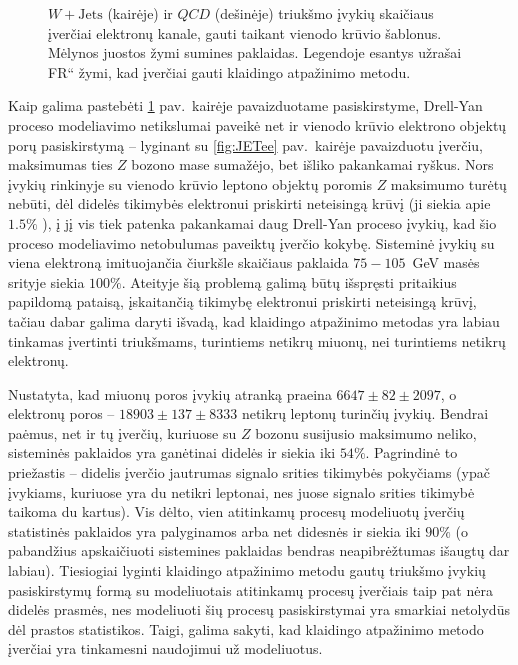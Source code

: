 \documentclass[a4paper, 12pt, oneside]{article}
\newcommand{\WJets}{W\! +\!\mathrm{Jets}}
\newcommand{\ltq}[1]{{\quotedblbase{}#1\textquotedblleft{}}}
\newcommand{\QCD}{QC\! D}
\newlength\q
\begin{document}
\begin{figure}[b!]
	\caption{\label{fig:JETeefit}
		$\WJets$ (kairėje) ir $\QCD$ (dešinėje) triukšmo įvykių skaičiaus įverčiai elektronų kanale, gauti taikant vienodo krūvio šablonus.
		Mėlynos juostos žymi sumines paklaidas.
		Legendoje esantys užrašai \ltq{FR} žymi, kad įverčiai gauti klaidingo atpažinimo metodu.
	}	
\end{figure}

Kaip galima pastebėti \ref{fig:JETeefit} pav.\ kairėje pavaizduotame pasiskirstyme, Drell-Yan proceso modeliavimo
netikslumai paveikė net ir vienodo krūvio elektrono objektų porų pasiskirstymą -- lyginant su \ref{fig:JETee} pav.\ kairėje
pavaizduotu įverčiu, maksimumas ties $Z$ bozono mase sumažėjo, bet išliko pakankamai ryškus.
Nors įvykių rinkinyje su vienodo krūvio leptono objektų poromis $Z$ maksimumo turėtų nebūti, dėl didelės tikimybės elektronui
priskirti neteisingą krūvį (ji siekia apie $1.5\%$ \cite{EleID}), į jį vis tiek patenka pakankamai daug Drell-Yan proceso įvykių,
kad šio proceso modeliavimo netobulumas paveiktų įverčio kokybę.
Sisteminė įvykių su viena elektroną imituojančia čiurkšle skaičiaus paklaida $75-105$~GeV masės srityje siekia $100\%$.
Ateityje šią problemą galimą būtų išspręsti pritaikius papildomą pataisą, įskaitančią tikimybę elektronui priskirti neteisingą krūvį,
tačiau dabar galima daryti išvadą, kad klaidingo atpažinimo metodas yra labiau tinkamas įvertinti triukšmams, turintiems netikrų
miuonų, nei turintiems netikrų elektronų.

Nustatyta, kad miuonų poros įvykių atranką praeina $6647\pm 82 \pm 2097$, o elektronų poros -- $18903\pm 137\pm 8333$
netikrų leptonų turinčių įvykių.
Bendrai paėmus, net ir tų įverčių, kuriuose su $Z$ bozonu susijusio maksimumo neliko, sisteminės paklaidos yra ganėtinai didelės
ir siekia iki $54\%$.
Pagrindinė to priežastis -- didelis įverčio jautrumas signalo srities tikimybės pokyčiams (ypač įvykiams, kuriuose yra
du netikri leptonai, nes juose signalo srities tikimybė taikoma du kartus).
Vis dėlto, vien atitinkamų procesų modeliuotų įverčių statistinės paklaidos yra palyginamos arba net didesnės ir
siekia iki $90\%$ (o pabandžius apskaičiuoti sistemines paklaidas bendras neapibrėžtumas išaugtų dar labiau).
Tiesiogiai lyginti klaidingo atpažinimo metodu gautų triukšmo įvykių pasiskirstymų formą su modeliuotais atitinkamų procesų įverčiais
taip pat nėra didelės prasmės, nes modeliuoti šių procesų pasiskirstymai yra smarkiai netolydūs dėl prastos statistikos.
Taigi, galima sakyti, kad klaidingo atpažinimo metodo įverčiai yra tinkamesni naudojimui už modeliuotus.
\end{document}
